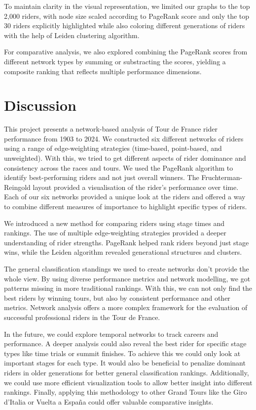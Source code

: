 \documentclass[9pt,twocolumn,twoside]{pnas-report}
\begin{document}
To maintain clarity in the visual representation, we limited our graphs to the top 2,000 riders, with node size scaled according to PageRank score and only the top 30 riders explicitly highlighted while also coloring different generations of riders with the help of Leiden \cite{Traag2019} clustering algorithm.

For comparative analysis, we also explored combining the PageRank scores from different network types by summing or substracting the scores, yielding a composite ranking that reflects multiple performance dimensions.


\section*{Discussion}

This project presents a network-based analysis of Tour de France rider performance from 1903 to 2024. 
We constructed six different networks of riders using a range of edge-weighting strategies (time-based, point-based, and unweighted). 
With this, we tried to get different aspects of rider dominance and consistency across the races and tours. 
We used the PageRank algorithm to identify best-performing riders and not just overall winners. 
The Fruchterman-Reingold layout provided a visualisation of the rider's performance over time.
Each of our six networks provided a unique look at the riders and offered a way to combine different measures of importance to highlight specific types of riders.


We introduced a new method for comparing riders using stage times and rankings. 
The use of multiple edge-weighting strategies provided a deeper understanding of rider strengths. 
PageRank helped rank riders beyond just stage wins, while the Leiden algorithm revealed generational structures and clusters.

The general classification standings we used to create networks don't provide the whole view. 
By using diverse performance metrics and network modelling, we got patterns missing in more traditional rankings. 
With this, we can not only find the best riders by winning tours, but also by consistent performance and other metrics. 
Network analysis offers a more complex framework for the evaluation of successful professional riders in the Tour de France.

In the future, we could explore temporal networks to track careers and performance. 
A deeper analysis could also reveal the best rider for specific stage types like time trials or summit finishes. 
To achieve this we could only look at important stages for each type. It would also be beneficial to penalize dominant riders in older generations for better general classification rankings.
Additionally, we could use more efficient visualization tools to allow better insight into different rankings. 
Finally, applying this methodology to other Grand Tours like the Giro d'Italia or Vuelta a España 
could offer valuable comparative insights.



\end{document}
